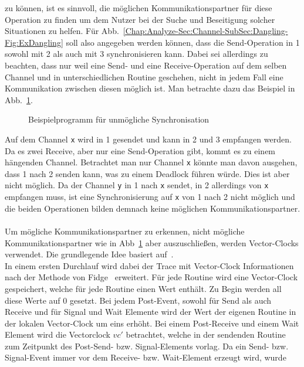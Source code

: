 zu können, ist es sinnvoll, die möglichen Kommunikationspartner für diese 
Operation zu finden um dem Nutzer bei der Suche und Beseitigung 
solcher Situationen zu helfen. Für Abb.~\ref{Chap:Analyze-Sec:Channel-SubSec:Dangling-Fig:ExDangling}
soll also angegeben werden können, dass die Send-Operation in 1 sowohl mit 2 als auch mit 3 
synchronisieren kann. Dabei sei allerdings zu beachten, dass nur weil eine Send- und eine 
Receive-Operation auf dem selben Channel und in unterschiedlichen Routine geschehen, nicht 
in jedem Fall eine Kommunikation zwischen diesen möglich ist. Man betrachte dazu das Beispiel in 
Abb.~\ref{Chap:Analyze-Sec:Channel-SubSec:Dangling-Fig:NoSync}.
\begin{figure}[h!]
  
  \caption{Beispielprogramm für unmögliche Synchronisation}
  \label{Chap:Analyze-Sec:Channel-SubSec:Dangling-Fig:NoSync}
\end{figure}
Auf dem Channel \texttt{x} wird in 1 gesendet und kann in 2 und 3 empfangen werden. Da es zwei Receive, 
aber nur eine Send-Operation gibt, kommt es zu einem hängenden Channel. Betrachtet man nur 
Channel \texttt{x} könnte man davon ausgehen, dass 1 nach 2 senden kann, was zu einem Deadlock
führen würde. Dies ist aber nicht möglich. Da der Channel \texttt{y} in 1 nach \texttt{x} sendet, 
in 2 allerdings von \texttt{x} empfangen muss, ist eine Synchronisierung auf \texttt{x} von 1 nach 
2 nicht möglich und die beiden Operationen bilden demnach keine möglichen Kommunikationspartner.\\\\
Um mögliche Kommunikationspartner zu erkennen, nicht mögliche Kommunikationspartner wie in 
Abb~\ref{Chap:Analyze-Sec:Channel-SubSec:Dangling-Fig:NoSync} aber auszuschließen, werden
Vector-Clocks verwendet. Die grundlegende Idee basiert auf~\cite{PPDP18}.\\
In einem ersten Durchlauf wird dabei der Trace mit Vector-Clock Informationen nach der Methode 
von Fidge~\cite{Fidge} erweitert. Für jede Routine 
wird eine Vector-Clock gespeichert, welche für jede Routine einen Wert enthält. Zu Begin werden 
all diese Werte auf 0 gesetzt. Bei jedem Post-Event, sowohl für Send als auch Receive und für 
Signal und Wait Elemente wird der Wert der eigenen Routine in der lokalen Vector-Clock um eins 
erhöht. Bei einem Post-Receive und einem Wait Element wird die Vectorclock $vc'$ betrachtet, 
welche in der sendenden Routine zum Zeitpunkt des Post-Send- bzw. Signal-Elements vorlag. 
Da ein Send- bzw. Signal-Event immer vor dem Receive- bzw. Wait-Element erzeugt wird, wurde 
